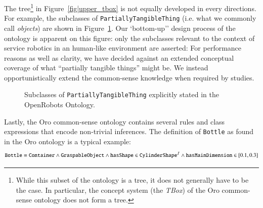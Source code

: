 \documentclass[preprint,3p,times]{elsarticle}
\newcommand{\concept}[1]{{\small \texttt{#1}}}
\newcommand{\ie}{i.e.\xspace}
\begin{document}
The tree\footnote{While this subset of the ontology is a tree, it does not
generally have to be the case. In particular, the concept system (the
\emph{TBox}) of the {\sc Oro} common-sense ontology does not form a tree.} in
Figure~\ref{fig|upper_tbox} is not equally developed in every directions. For
example, the subclasses of \concept{PartiallyTangibleThing} (\ie what we
commonly call \emph{objects}) are shown in
Figure~\ref{fig|tangible_things_tbox}. Our `bottom-up'' design process of the
ontology is apparent on this figure: only the subclasses relevant to the
context of service robotics in an human-like environment are asserted:
For performance reasons as well as clarity, we have decided against an extended
conceptual coverage of what ``partially tangible things'' might be. We instead
opportunistically extend the common-sense knowledge when required by studies.


\begin{figure}
    \centering

    \caption{Subclasses of \concept{PartiallyTangibleThing} explicitly stated in the
    OpenRobots Ontology.}
    \label{fig|tangible_things_tbox}
\end{figure}

Lastly, the {\sc Oro} common-sense ontology contains several rules and class
expressions that encode non-trivial inferences. The definition of
\concept{Bottle} as found in the {\sc Oro} ontology is a typical example:
$$
\text{\tt Bottle} \equiv \text{\tt Container} \wedge 
                         \text{\tt GraspableObject} \wedge
                         \text{\tt hasShape} \in \text{\tt CylinderShape}^{\mathcal{I}} \wedge
                         \text{\tt hasMainDimension} \in [0.1, 0.3]
$$
\end{document}
